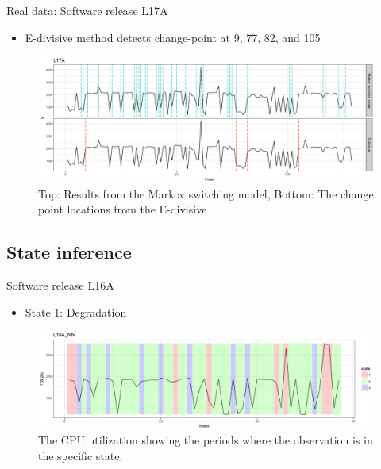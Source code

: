 \documentclass{beamer}
\begin{document}
\begin{frame}
Real data: Software release L17A

\begin{itemize}
	\item E-divisive method detects change-point at 9, 77, 82, and 105
\end{itemize}

\begin{figure}
	\includegraphics[width=1\linewidth]{compare_L17A}
	\caption{Top: Results from the Markov switching model, Bottom: The change point locations from the E-divisive}
\end{figure}
\end{frame}

\subsection{State inference}
\begin{frame}
Software release L16A

\begin{itemize}
	\item State 1: Degradation
\end{itemize}

\begin{figure}
	\includegraphics[width=1\linewidth]{L16A_NN1}
	\caption{The CPU utilization showing the periods where the observation is in the specific state.}
\end{figure}

\end{frame}
\end{document}
